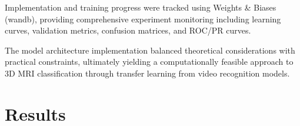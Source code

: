 \documentclass[12pt, a4paper]{article}
\begin{document}
Implementation and training progress were tracked using Weights \& Biases (wandb), providing comprehensive experiment monitoring including learning curves, validation metrics, confusion matrices, and ROC/PR curves.

The model architecture implementation balanced theoretical considerations with practical constraints, ultimately yielding a computationally feasible approach to 3D MRI classification through transfer learning from video recognition models.

\section{Results}













\end{document}
